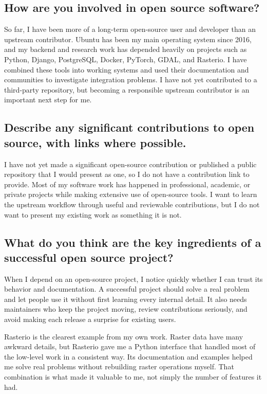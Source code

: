 \documentclass[11pt]{article}
\begin{document}
\subsection*{How are you involved in open source software?}

So far, I have been more of a long-term open-source user and developer than an upstream contributor. Ubuntu has been my main operating system since 2016, and my backend and research work has depended heavily on projects such as Python, Django, PostgreSQL, Docker, PyTorch, GDAL, and Rasterio. I have combined these tools into working systems and used their documentation and communities to investigate integration problems. I have not yet contributed to a third-party repository, but becoming a responsible upstream contributor is an important next step for me.

\subsection*{Describe any significant contributions to open source, with links where possible.}

I have not yet made a significant open-source contribution or published a public repository that I would present as one, so I do not have a contribution link to provide. Most of my software work has happened in professional, academic, or private projects while making extensive use of open-source tools. I want to learn the upstream workflow through useful and reviewable contributions, but I do not want to present my existing work as something it is not.

\subsection*{What do you think are the key ingredients of a successful open source project?}

When I depend on an open-source project, I notice quickly whether I can trust its behavior and documentation. A successful project should solve a real problem and let people use it without first learning every internal detail. It also needs maintainers who keep the project moving, review contributions seriously, and avoid making each release a surprise for existing users.

Rasterio is the clearest example from my own work. Raster data have many awkward details, but Rasterio gave me a Python interface that handled most of the low-level work in a consistent way. Its documentation and examples helped me solve real problems without rebuilding raster operations myself. That combination is what made it valuable to me, not simply the number of features it had.
\end{document}
